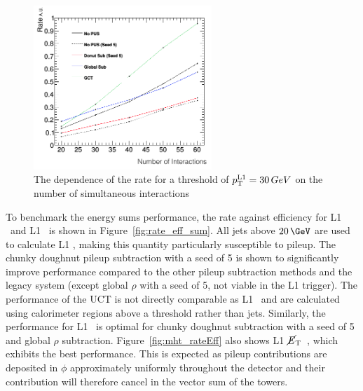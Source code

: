\begin{figure}
\centering
    \includegraphics[width=0.6\textwidth]{./Figures/triggerUpgrade/neutrinonvtx_jet1}
  \caption{The dependence of the rate for a threshold of ${p_{\text T}^{\text{L1}}}=30\,GeV$ on the number of simultaneous interactions}
  \label{fig:rate_nvtx}
\end{figure}

To benchmark the energy sums performance, the rate against efficiency for L1 \scalht~and L1 \mht~is shown in Figure~\ref{fig:rate_eff_sum}.
All jets above $20\,\GeV$ are used to calculate L1 \scalht, making this quantity particularly susceptible to pileup. The chunky doughnut 
pileup subtraction with a seed of 5 is shown to significantly improve performance compared to the other pileup subtraction
methods and the legacy system (except global $\rho$ with a seed of 5, not viable in the L1 trigger). The performance of the UCT is not 
directly comparable as L1 \scalht~and \mht are calculated using calorimeter regions above a threshold rather than jets. Similarly, the performance for 
L1 \mht~is optimal for chunky doughnut subtraction with a seed of 5 and global $\rho$ subtraction. 
Figure~\ref{fig:mht_rateEff} also shows L1 $\mbox{$\cancel{E}_\text{T}$}$~, which exhibits the best performance. This is expected as 
pileup contributions are deposited in $\phi$ approximately uniformly throughout the detector and their contribution will
therefore cancel in the vector sum of the towers.

